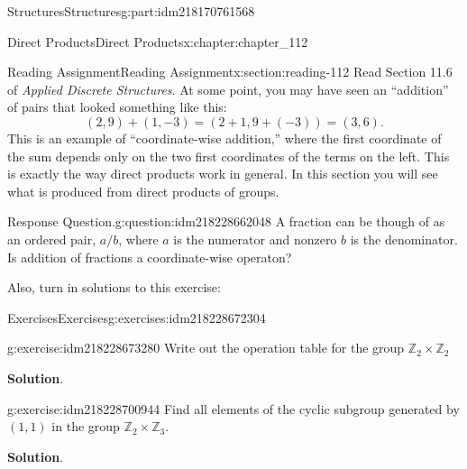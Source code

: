 \documentclass[oneside,10pt,]{book}
\newcommand{\blocktitlefont}{\relax}
\numberwithin{equation}{section}
\begin{document}
\begin{partptx}{Structures}{}{Structures}{}{}{g:part:idm218170761568}
\begin{chapterptx}{Direct Products}{}{Direct Products}{}{}{x:chapter:chapter_112}
%
%
%
\typeout{************************************************}
\typeout{************************************************}
%
\begin{sectionptx}{Reading Assignment}{}{Reading Assignment}{}{}{x:section:reading-112}
Read Section 11.6 of \emph{Applied Discrete Structures}. At some point, you may have seen an ``addition'' of pairs that looked something like this:%
\begin{equation*}
(2,9)+(1,-3) = (2+1,9+(-3))=(3,6).
\end{equation*}
This is an example of ``coordinate-wise addition,'' where the first coordinate of the sum depends only on the two first coordinates of the terms on the left. This is exactly the way direct products work in general. In this section you will see what is produced from direct products of groups.%
\begin{question}{Response Question.}{g:question:idm218228662048}%
A fraction can be though of as an ordered pair, \(a/b\), where \(a\) is the numerator and nonzero \(b\) is the denominator.  Is addition of fractions a coordinate-wise operaton?%
\end{question}
Also, turn in solutions to this exercise:%
%
%
\typeout{************************************************}
\typeout{************************************************}
%
\begin{exercises-subsection-numberless}{Exercises}{}{Exercises}{}{}{g:exercises:idm218228672304}
\par\medskip\noindent%
%
\begin{exercisegroup}
\begin{divisionexerciseeg}{1}{}{}{g:exercise:idm218228673280}%
Write out the operation table for the group \(\mathbb{Z}_2 \times \mathbb{Z}_2\)%
\par\smallskip%
\noindent\textbf{\blocktitlefont Solution}.\hypertarget{g:solution:idm218228677520}{}\quad{}%
\end{divisionexerciseeg}%
\begin{divisionexerciseeg}{2}{}{}{g:exercise:idm218228700944}%
Find all elements of the cyclic subgroup generated by \((1,1)\) in the group \(\mathbb{Z}_2 \times \mathbb{Z}_3\).%
\par\smallskip%
\noindent\textbf{\blocktitlefont Solution}.\hypertarget{g:solution:idm218228730816}{}\quad{}%
\end{divisionexerciseeg}%
\end{exercisegroup}

\end{exercises-subsection-numberless}
\end{sectionptx}
\end{chapterptx}
\end{partptx}
\end{document}
